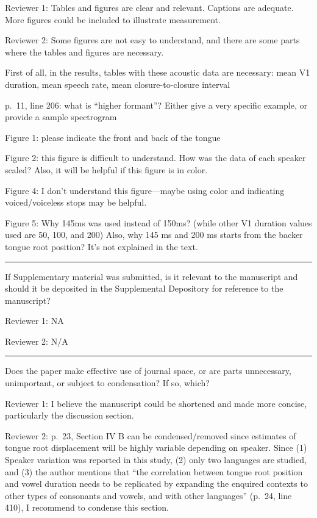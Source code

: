 \documentclass[]{article}
\begin{document}
Reviewer 1: Tables and figures are clear and relevant. Captions are
adequate. More figures could be included to illustrate measurement.

Reviewer 2: Some figures are not easy to understand, and there are some
parts where the tables and figures are necessary.

First of all, in the results, tables with these acoustic data are
necessary: mean V1 duration, mean speech rate, mean closure-to-closure
interval

p.~11, line 206: what is ``higher formant''? Either give a very specific
example, or provide a sample spectrogram

Figure 1: please indicate the front and back of the tongue

Figure 2: this figure is difficult to understand. How was the data of
each speaker scaled? Also, it will be helpful if this figure is in
color.

Figure 4: I don't understand this figure---maybe using color and
indicating voiced/voiceless stops may be helpful.

Figure 5: Why 145ms was used instead of 150ms? (while other V1 duration
values used are 50, 100, and 200) Also, why 145 ms and 200 ms starts
from the backer tongue root position? It's not explained in the text.

\par

\noindent

\rule{\textwidth}{0.4pt}

If Supplementary material was submitted, is it relevant to the
manuscript and should it be deposited in the Supplemental Depository for
reference to the manuscript?

Reviewer 1: NA

Reviewer 2: N/A

\par

\noindent

\rule{\textwidth}{0.4pt}

Does the paper make effective use of journal space, or are parts
unnecessary, unimportant, or subject to condensation? If so, which?

Reviewer 1: I believe the manuscript could be shortened and made more
concise, particularly the discussion section.

Reviewer 2: p.~23, Section IV B can be condensed/removed since estimates
of tongue root displacement will be highly variable depending on
speaker. Since (1) Speaker variation was reported in this study, (2)
only two languages are studied, and (3) the author mentions that ``the
correlation between tongue root position and vowel duration needs to be
replicated by expanding the enquired contexts to other types of
consonants and vowels, and with other languages'' (p.~24, line 410), I
recommend to condense this section.
\end{document}
